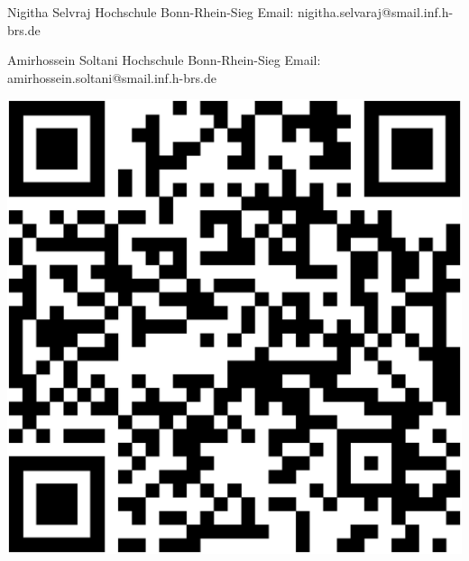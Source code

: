 \documentclass[hbrs-poster.tex]{subfiles}
\begin{document}
    {
        \begin{minipage}{0.75\linewidth}
            Nigitha Selvraj\newline
            Hochschule Bonn-Rhein-Sieg\newline
            Email: nigitha.selvaraj@smail.inf.h-brs.de\newline
        \end{minipage}
        \begin{minipage}{0.75\linewidth}
            Amirhossein Soltani\newline
            Hochschule Bonn-Rhein-Sieg\newline
            Email: amirhossein.soltani@smail.inf.h-brs.de\newline
        \end{minipage}
        \begin{minipage}{0.24\linewidth}
            \vspace{-1.5cm}
            \begin{tikzfigure}
                \includegraphics[scale=0.2]{figures/qrcode.eps}
            \end{tikzfigure}
        \end{minipage}
    }
\end{document}
